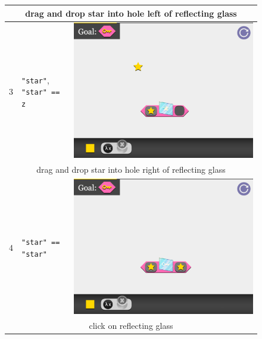 \begin{figure}
\begin{tabular}{|l|p{4.5cm}|l|}
    \multicolumn{3}{c}{drag and drop star into hole left of reflecting glass} \\\hline
    3 & \verb|"star"|, \verb| "star" == z|              & \includegraphics[scale=0.15]{images/reduct/lambda_xdot_x_x_-_y_eq_z_-_a_-_3.png} \\\hline
    \multicolumn{3}{c}{drag and drop star into hole right of reflecting glass} \\\hline
    4 & \verb|"star" == "star"|                         & \includegraphics[scale=0.15]{images/reduct/lambda_xdot_x_x_-_y_eq_z_-_a_-_4.png} \\\hline
    \multicolumn{3}{c}{click on reflecting glass} \\\hline

\end{tabular}
\end{figure}

